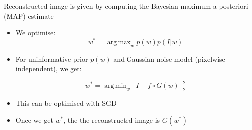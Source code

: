 \documentclass[8pt,xcolor=table,aspectratio=169]{beamer}
\DeclareMathOperator*{\argmin}{arg\,min}
\DeclareMathOperator*{\argmax}{arg\,max}
\begin{document}
\newcommand{\ci}[1]{\circ{#1}}
\newcommand{\wplus}{$\mathcal{W}^{+}$ }
\newcommand{\loss}{\mathcal{L}}

\newcommand{\bit}[1]{\begin{itemize} 
\item #1
\end{itemize}}

\begin{frame}{Reconstructed image is given by computing the Bayesian maximum a-posteriori (MAP) estimate\\
}



\begin{itemize}
 \item We optimise:
$$ w^* = \argmax_w p(w)p(I|w)$$

\item For uninformative prior $p(w)$ and Gaussian noise model (pixelwise independent), we get:

$$ w^* = \argmin_w || I - f \circ G (w) ||_2^2$$

\item This can be optimised with SGD

\item Once we get $w^*$, the the reconstructed image is $G(w^*)$

\end{itemize}

\begin{center}
\vt
\brgmoursshortloss
\end{center}
 
\end{frame}
% 
\end{document}
